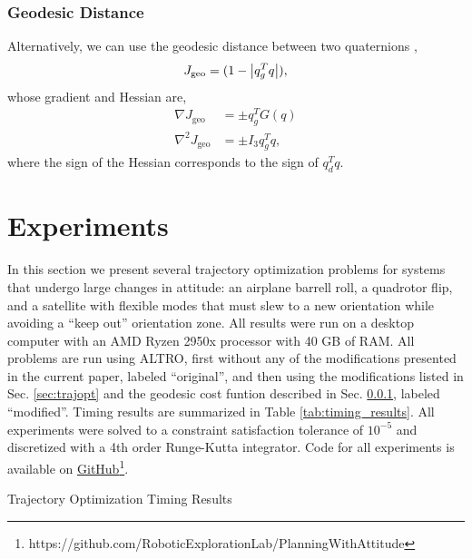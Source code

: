 \documentclass[letterpaper, 10 pt, conference]{ieeeconf}  %
\begin{document}
        \subsubsection{Geodesic Distance} \label{sec:geodesic}
            Alternatively, we can use the geodesic distance between two quaternions
            \cite{Kuffner2004},
            \begin{equation} \label{eq:quat_geodesic}
                J_\text{geo} = (1-\abs{q_g^T q}) ,
            \end{equation}
            whose gradient and Hessian are,
            \begin{align}
                \nabla J_\text{geo} &= \pm q_g^T G(q) \\
                \nabla^2 J_\text{geo} &= \pm I_3 q_g^T q ,
            \end{align}
            where the sign of the Hessian corresponds to the sign of $q_d^T q$.


\section{Experiments} \label{sec:experiments}
    In this section we present several trajectory optimization problems for systems that
    undergo large changes in attitude: an airplane barrell roll, a quadrotor flip, and a
    satellite with flexible modes that must slew to a new orientation while avoiding a 
    ``keep out'' orientation zone. All results were run on a desktop computer with an 
    AMD Ryzen 2950x processor with 40 GB of RAM. 
    All problems are run using ALTRO, first without any of the modifications presented 
    in the current paper, labeled ``original'', and then using the modifications listed
    in Sec. \ref{sec:trajopt} and the geodesic cost funtion described in Sec. \ref{sec:geodesic},
    labeled ``modified''.
    Timing results are summarized in Table \ref{tab:timing_results}.
    All experiments were solved to a constraint satisfaction tolerance of $10^{-5}$ and 
    discretized with a 4th order Runge-Kutta integrator.
    Code for all experiments is available on 
    \href{https://github.com/RoboticExplorationLab/PlanningWithAttitude}
    {GitHub\footnote{\url{https://github.com/RoboticExplorationLab/PlanningWithAttitude}}}.

    \begin{table}
        \centering
        
        \label{tab:timing_results}
        \caption{Trajectory Optimization Timing Results}
    \end{table}
        
\end{document}
